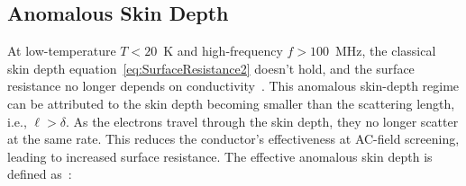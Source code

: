     \subsection{Anomalous Skin Depth}

    At low-temperature $T<20$~K and high-frequency $f>100$~MHz, the classical skin depth equation~\ref{eq:SurfaceResistance2} doesn't hold, and the surface resistance no longer depends on conductivity~\cite{pippardf.r.s.SurfaceImpedanceSuperconductors1947}. This anomalous skin-depth regime can be attributed to the skin depth becoming smaller than the scattering length, i.e., $\ell > \delta$. As the electrons travel through the skin depth, they no longer scatter at the same rate. This reduces the conductor's effectiveness at AC-field screening, leading to increased surface resistance. The effective anomalous skin depth is defined as~\cite{Braine:2024nzi}:

